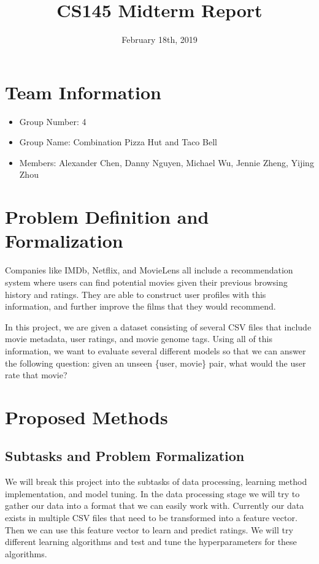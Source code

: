 \documentclass[11pt]{article}
\begin{document}
\title{\vspace{-2em}CS145 Midterm Report\vspace{-2em}}
\date{February 18th, 2019\vspace{-2em}}
\author{}
\maketitle

\section{Team Information}

\begin{itemize}
    \item Group Number: 4
    \item Group Name: Combination Pizza Hut and Taco Bell
    \item Members: Alexander Chen, Danny Nguyen, Michael Wu, Jennie Zheng, Yijing Zhou
\end{itemize}

\section{Problem Definition and Formalization}

Companies like IMDb, Netflix, and MovieLens all include a recommendation system where users
can find potential movies given their previous browsing history and ratings. They are able
to construct user profiles with this information, and further improve the films that they
would recommend.

In this project, we are given a dataset consisting of several CSV files that include movie
metadata, user ratings, and movie genome tags. Using all of this information,
we want to evaluate several different models so that we can answer the following question:
given an unseen \{user, movie\} pair, what would the user rate that movie?

\section{Proposed Methods}

\subsection{Subtasks and Problem Formalization}

We will break this project into the subtasks of data processing, learning method implementation, and model tuning.
In the data processing stage we will try to gather our data into a format that we can easily work with. Currently
our data exists in multiple CSV files that need to be transformed into a feature vector. Then we can use this feature
vector to learn and predict ratings. We will try different learning algorithms and test and tune the hyperparameters
for these algorithms.
\end{document}
